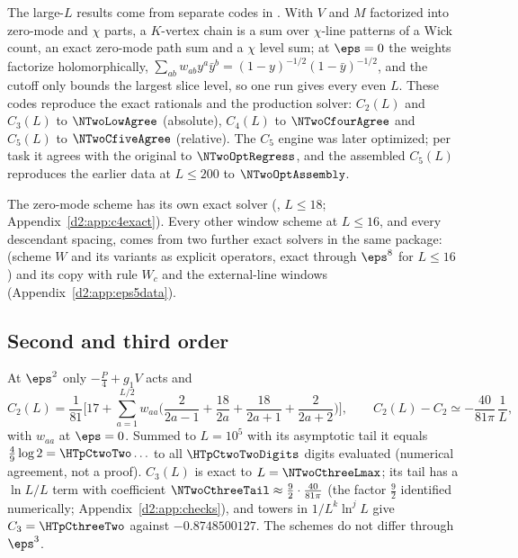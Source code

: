 The large-$L$ results come from separate codes in . With $V$ and $M$ factorized
into zero-mode and $\chi$ parts, a $K$-vertex chain is a sum over $\chi$-line patterns of a Wick count, an exact zero-mode
path sum and a $\chi$ level sum; at $\eps=0$ the weights factorize holomorphically, $\sum_{ab}w_{ab}y^a\bar y^b=(1-y)^{-1/2}(1-\bar
y)^{-1/2}$, and the cutoff only bounds the largest slice level, so one run gives every even $L$. These codes reproduce the exact
rationals and the production solver: $C_2(L)$ and $C_3(L)$ to $\NTwoLowAgree$ (absolute), $C_4(L)$ to $\NTwoCfourAgree$ and
$C_5(L)$ to $\NTwoCfiveAgree$ (relative). The $C_5$ engine was later optimized; per task it agrees with the original to $\NTwoOptRegress$,
and the assembled $C_5(L)$ reproduces the earlier data at $L\le200$ to $\NTwoOptAssembly$.

The zero-mode scheme has its own exact solver (, $L\le18$; Appendix~\ref{d2:app:c4exact}). Every
other window scheme at $L\le16$, and every descendant spacing, comes from two further exact solvers in the same package:  (scheme $W$ and its variants as explicit operators, exact through
$\eps^8$ for $L\le16$) and its copy  with rule $W_c$ and the external-line windows
(Appendix~\ref{d2:app:eps5data}).

\subsection{Second and third order}\label{d2:low}
At $\eps^2$ only $-\frac P4+g_1V$ acts and
\begin{equation}
 C_2(L)=\frac1{81}\Big[17+\sum_{a=1}^{L/2}w_{aa}\Big(\frac2{2a-1}+\frac{18}{2a}+\frac{18}{2a+1}+\frac2{2a+2}\Big)\Big],\qquad
 C_2(L)-C_2\simeq-\frac{40}{81\pi}\,\frac1L ,
 \label{d2:eq:C2}
\end{equation}
with $w_{aa}$ at $\eps=0$. Summed to $L=10^5$ with its asymptotic tail it equals $\frac49\log2=\HTpCtwoTwo\ldots$ to all
$\HTpCtwoTwoDigits$ digits evaluated (numerical agreement, not a proof). $C_3(L)$ is exact to $L=\NTwoCthreeLmax$; its tail
has a $\ln L/L$ term with coefficient $\NTwoCthreeTail\approx\frac92\cdot\frac{40}{81\pi}$ (the factor $\frac92$ identified
numerically; Appendix~\ref{d2:app:checks}), and towers in $1/L^k\ln^jL$ give
$C_3=\HTpCthreeTwo$ against $-0.8748500127$. The schemes do not differ through $\eps^3$.

